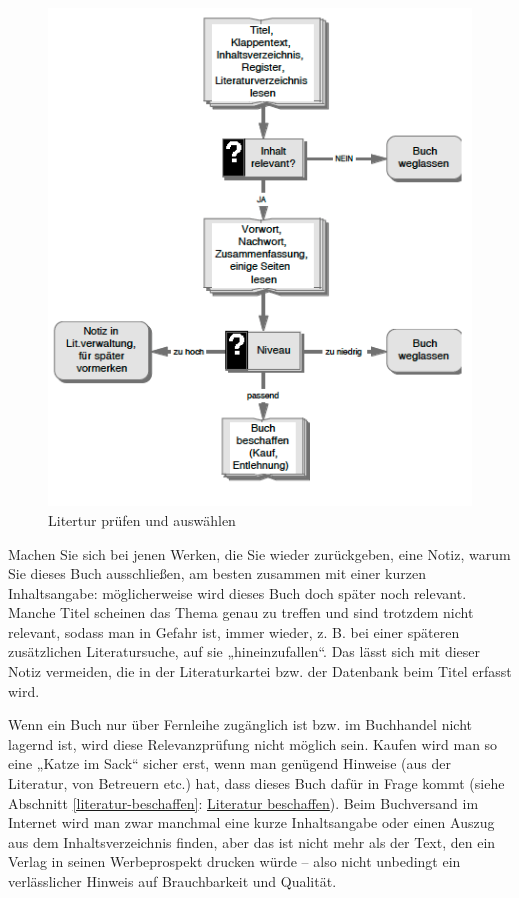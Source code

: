 \documentclass[]{book}
\theoremstyle{definition}
\theoremstyle{definition}
\theoremstyle{definition}
\theoremstyle{remark}
\begin{document}
\begin{figure}

{\centering \includegraphics{images/recherchieren-literatur-auswaehlen-min} 

}

\caption{Litertur prüfen und auswählen}\label{fig:unnamed-chunk-8}
\end{figure}

Machen Sie sich bei jenen Werken, die Sie wieder zurückgeben, eine
Notiz, warum Sie dieses Buch ausschließen, am besten zusammen mit einer
kurzen Inhaltsangabe: möglicherweise wird dieses Buch doch später noch
relevant. Manche Titel scheinen das Thema genau zu treffen und sind
trotzdem nicht relevant, sodass man in Gefahr ist, immer wieder, z. B.
bei einer späteren zusätzlichen Literatursuche, auf sie
„hineinzufallen``. Das lässt sich mit dieser Notiz vermeiden, die in der
Literaturkartei bzw. der Datenbank beim Titel erfasst wird.

Wenn ein Buch nur über Fernleihe zugänglich ist bzw. im Buchhandel nicht
lagernd ist, wird diese Relevanzprüfung nicht möglich sein. Kaufen wird
man so eine „Katze im Sack`` sicher erst, wenn man genügend Hinweise
(aus der Literatur, von Betreuern etc.) hat, dass dieses Buch dafür in
Frage kommt (siehe Abschnitt \ref{literatur-beschaffen}:
\protect\hyperlink{literatur-beschaffen}{Literatur beschaffen}). Beim
Buchversand im Internet wird man zwar manchmal eine kurze Inhaltsangabe
oder einen Auszug aus dem Inhaltsverzeichnis finden, aber das ist nicht
mehr als der Text, den ein Verlag in seinen Werbeprospekt drucken würde
-- also nicht unbedingt ein verlässlicher Hinweis auf Brauchbarkeit und
Qualität.
\end{document}
